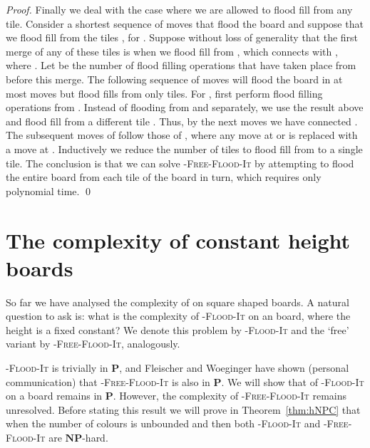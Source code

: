 \documentclass[a4paper,11pt]{llncs}
\newcounter{l}
\newcommand{\Ptime}{\ensuremath{\mathbf{P}}}
\newcommand{\NPtime}{\ensuremath{\mathbf{NP}}}
\newcommand{\Coloroid}[1]{-\textsc{Flood-It}}
\newcommand{\ColoroidFree}[1]{-\textsc{Free-Flood-It}}
\newcommand{\recdim}[2]{}
\begin{document}
\begin{proof}
    Finally we deal with the case where we are allowed to flood fill from any tile. Consider a shortest sequence  of moves that flood the board and suppose that we flood fill from the tiles , for . Suppose without loss of generality that the first merge of any of these tiles is when we flood fill from , which connects  with , where . Let  be the number of flood filling operations that have taken place from  before this merge. The following sequence  of moves will flood the board in at most  moves but flood fills from only  tiles. For , first perform  flood filling operations from . Instead of flooding from  and  separately, we use the result above and flood fill from a different tile . Thus, by the next  moves we have connected . The subsequent moves of  follow those of , where any move at  or  is replaced with a move at . Inductively we reduce the number of tiles to flood fill from to a single tile. The conclusion is that we can solve \ColoroidFree{2} by attempting to flood the entire board from each tile of the board in turn, which requires only polynomial time.
    \qed
\end{proof}

\section{The complexity of constant height boards} \label{sec:shape}


So far we have analysed the complexity of  on square shaped \recdim{n}{n} boards. A natural question to ask is: what is the complexity of \Coloroid{c} on an \recdim{h}{n} board, where the height  is a fixed constant? We denote this problem by \Coloroid{(c,h)} and the `free' variant by \ColoroidFree{(c,h)}, analogously.

\Coloroid{(c,1)} is trivially in \Ptime, and Fleischer and Woeginger have shown (personal communication) that \ColoroidFree{(c,1)} is also in \Ptime. We will show that of \Coloroid{(c,2)} on a \recdim{2}{n} board remains in \Ptime. However, the complexity of \ColoroidFree{(c,2)} remains unresolved. Before stating this result we will prove in Theorem~\ref{thm:hNPC} that when the number of colours is unbounded and  then both \Coloroid{(c,h)} and \ColoroidFree{(c,h)} are \NPtime-hard.
\end{document}

